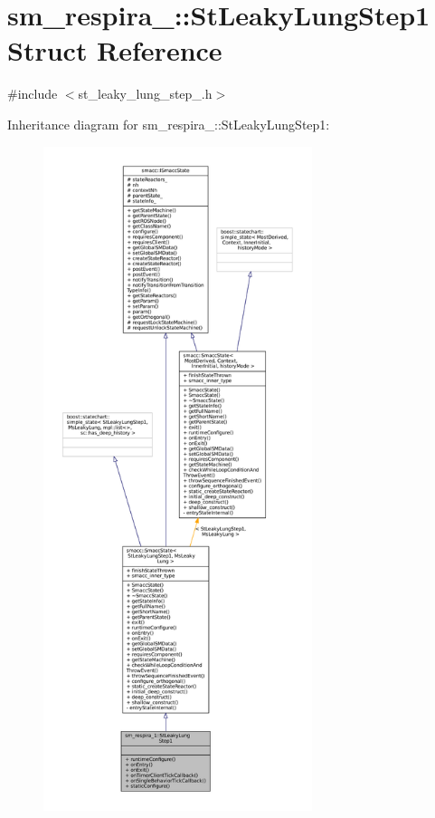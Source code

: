 \hypertarget{structsm__respira__1_1_1StLeakyLungStep1}{}\section{sm\+\_\+respira\+\_\+:\+:St\+Leaky\+Lung\+Step1 Struct Reference}
\label{structsm__respira__1_1_1StLeakyLungStep1}


{\ttfamily \#include $<$st\+\_\+leaky\+\_\+lung\+\_\+step\+\_.\+h$>$}



Inheritance diagram for sm\+\_\+respira\+\_\+:\+:St\+Leaky\+Lung\+Step1\+:
\nopagebreak
\begin{figure}[H]
\begin{center}
\leavevmode
\includegraphics[height=550pt]{structsm__respira__1_1_1StLeakyLungStep1__inherit__graph}
\end{center}
\end{figure}



